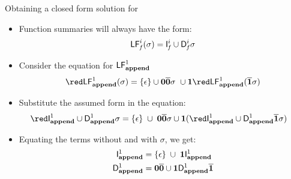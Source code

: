 \begin{frame}{Obtaining a closed form solution for  \Lfonly}
  \begin{itemize}
  \item<1-> Function summaries will always have the form:
    \begin{align*}
      \mathsf{LF}_{\mathit f}^{i}( {\mathit \sigma}) = \mathsf{I}_{\mathit f}^{i} \cup \mathsf{D}_{\mathit f}^{i}\sigma
    \end{align*}
\item<2-> Consider the  equation for $\mathsf{LF}^{1}_{\mathbf{append}}$
    \begin{align*}
{\red\Lf{\append}{1}{\sigma}} = \{\epsilon\} \cup \acar\bcar\sigma ~
\cup \acdr{\red \Lf{\append}{1}{\bcdr\sigma}}
    \end{align*}
\item<3->Substitute the assumed  form in the equation:
    \begin{align*}
        {\red\Uf{\append}{1}   \cup    \Df{\append}{1}\sigma}
        &= \{\epsilon\}\;  \cup\;
      \acar\bcar\sigma\cup  
      \acdr({\red\Uf{\append}{1} \cup
      \Df{\append}{1}\bcdr\sigma})
    \end{align*}
\item<3-> Equating the terms without and with $\sigma$, we get:  
    \begin{align*}
        \mathsf{I}_{\mathit {\mathbf{append}}}^{1} &= \{\epsilon\}\;  \cup\;
      \mathbf{1}\mathsf{I}_{\mathit {\mathbf{append}}}^{1}\\
  \mathsf{D}_{\mathit {\mathbf{append}}}^{1} &= \mathbf{0}\overline{\mathbf{0}}\cup\mathbf{1} \mathsf{D}_{\mathit {\mathbf{append}}}^{1}\overline{\mathbf{1}}
    \end{align*}
  \end{itemize}
\end{frame}


